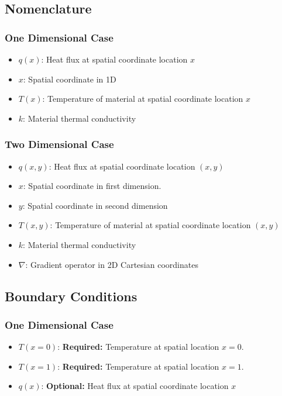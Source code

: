 \documentclass[letterpaper,12pt]{article}
\begin{document}
\subsection{Nomenclature}
\subsubsection{One Dimensional Case}
\begin{itemize}
\item $q(x)$: Heat flux at spatial coordinate location $x$
\item $x$: Spatial coordinate in 1D
\item $T(x)$: Temperature of material at spatial coordinate location $x$
\item $k$: Material thermal conductivity
\end{itemize}
\subsubsection{Two Dimensional Case}
\begin{itemize}
\item $q(x,y)$: Heat flux at spatial coordinate location $(x,y)$
\item $x$: Spatial coordinate in first dimension.
\item $y$: Spatial coordinate in second dimension
\item $T(x,y)$: Temperature of material at spatial coordinate location $(x,y)$
\item $k$: Material thermal conductivity
\item $\nabla$: Gradient operator in 2D Cartesian coordinates
\end{itemize}
\subsection{Boundary Conditions}
\subsubsection{One Dimensional Case}
\begin{itemize}
\item $T(x=0)$: \textbf{Required:} Temperature at spatial location $x=0$.
\item $T(x=1)$: \textbf{Required:} Temperature at spatial location $x=1$. 
\item $q(x)$: \textbf{Optional:} Heat flux at spatial coordinate location $x$
\end{itemize}
\end{document}
